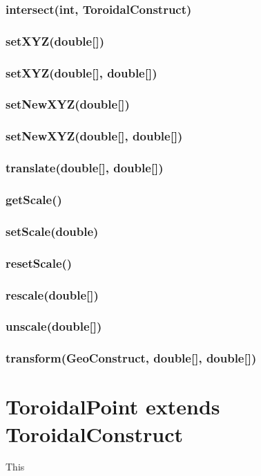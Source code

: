 \documentclass[a4paper,10pt]{report}
\begin{document}
\subsubsection{intersect(int, ToroidalConstruct)}
\subsubsection{setXYZ(double[])}
\subsubsection{setXYZ(double[], double[])}
\subsubsection{setNewXYZ(double[])}
\subsubsection{setNewXYZ(double[], double[])}
\subsubsection{translate(double[], double[])}
\subsubsection{getScale()}
\subsubsection{setScale(double)}
\subsubsection{resetScale()}
\subsubsection{rescale(double[])}
\subsubsection{unscale(double[])}
\subsubsection{transform(GeoConstruct, double[], double[])}
\section{ToroidalPoint extends ToroidalConstruct} This
\end{document}
